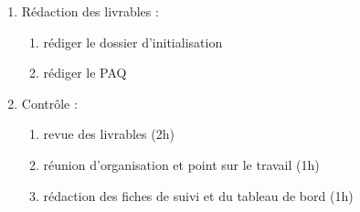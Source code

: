 \begin{enumerate}
\begin{enumerate}
            \item Rédaction des livrables : 
                \begin{enumerate}
                  \item rédiger le dossier d'initialisation 
                  \item rédiger le PAQ 
                \end{enumerate}

            \item Contrôle :
              \begin{enumerate}
                \item revue des livrables (2h)
                \item réunion d'organisation et point sur le travail (1h) 
                \item rédaction des fiches de suivi et du tableau de bord (1h)
              \end{enumerate}
      \end{enumerate}


\end{enumerate}
